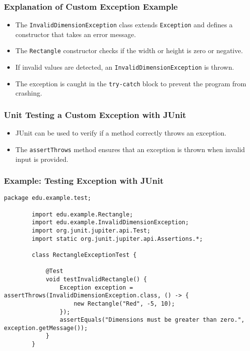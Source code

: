 \documentclass[aspectratio=169, table]{beamer}
\begin{document}
\begin{frame}[fragile]
	\frametitle{Explanation of Custom Exception Example}
	
	\begin{itemize}
		\item The \texttt{InvalidDimensionException} class extends \texttt{Exception} and defines a constructor that takes an error message.
		\item The \texttt{Rectangle} constructor checks if the width or height is zero or negative.
		\item If invalid values are detected, an \texttt{InvalidDimensionException} is thrown.
		\item The exception is caught in the \texttt{try-catch} block to prevent the program from crashing.
	\end{itemize}
\end{frame}

\begin{frame}[fragile]
	\frametitle{Unit Testing a Custom Exception with JUnit}
	
	\begin{itemize}
		\item JUnit can be used to verify if a method correctly throws an exception.
		\item The \texttt{assertThrows} method ensures that an exception is thrown when invalid input is provided.
	\end{itemize}
\end{frame}

\begin{frame}[fragile]
	\frametitle{Example: Testing Exception with JUnit}
	
	\begin{lstlisting}[style=JavaStyle, caption={Testing Exception with JUnit: \texttt{RectangleExceptionTest.java}}]
		package edu.example.test;
		
		import edu.example.Rectangle;
		import edu.example.InvalidDimensionException;
		import org.junit.jupiter.api.Test;
		import static org.junit.jupiter.api.Assertions.*;
		
		class RectangleExceptionTest {
			
			@Test
			void testInvalidRectangle() {
				Exception exception = assertThrows(InvalidDimensionException.class, () -> {
					new Rectangle("Red", -5, 10);
				});
				assertEquals("Dimensions must be greater than zero.", exception.getMessage());
			}
		}
	\end{lstlisting}
\end{frame}
\end{document}
